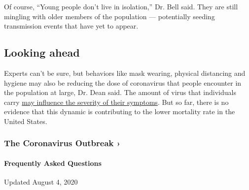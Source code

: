 Of course, ``Young people don't live in isolation,'' Dr. Bell said. They
are still mingling with older members of the population --- potentially
seeding transmission events that have yet to appear.

\hypertarget{looking-ahead}{%
\subsection{Looking ahead}\label{looking-ahead}}

Experts can't be sure, but behaviors like mask wearing, physical
distancing and hygiene may also be reducing the dose of coronavirus that
people encounter in the population at large, Dr. Dean said. The amount
of virus that individuals carry
\href{https://www.nytimes3xbfgragh.onion/2020/05/29/health/coronavirus-transmission-dose.html}{may
influence the severity of their symptoms}. But so far, there is no
evidence that this dynamic is contributing to the lower mortality rate
in the United States.

\href{https://www.nytimes3xbfgragh.onion/news-event/coronavirus?action=click\&pgtype=Article\&state=default\&region=MAIN_CONTENT_3\&context=storylines_faq}{}

\hypertarget{the-coronavirus-outbreak-}{%
\subsubsection{The Coronavirus Outbreak
›}\label{the-coronavirus-outbreak-}}

\hypertarget{frequently-asked-questions}{%
\paragraph{Frequently Asked
Questions}\label{frequently-asked-questions}}

Updated August 4, 2020


